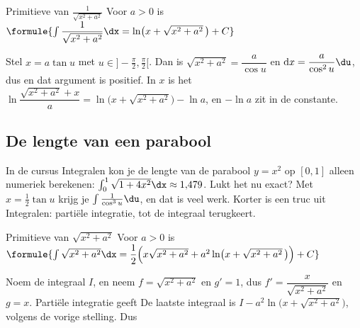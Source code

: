 \begin{theorie}
\begin{stelling}{Primitieve van $\frac{1}{\sqrt{x^2 + a^2}}$}
Voor $a > 0$ is \qquad $\formule{\int \dfrac{1}{\sqrt{x^2 + a^2}}\dx = \ln\bigl(x + \sqrt{x^2 + a^2}\,\bigr) + C}$
\end{stelling}

\begin{bewijs}
Stel $x = a\tan u$ met $u \in \bigl]-\tfrac{\pi}{2}, \tfrac{\pi}{2}\bigr[$. Dan is $\sqrt{x^2 + a^2} = \dfrac{a}{\cos u}$ en $\mathrm{d}x = \dfrac{a}{\cos^2 u}\du$, dus
en dat argument is positief. In $x$ is het $\ln\dfrac{\sqrt{x^2 + a^2} + x}{a} = \ln\bigl(x + \sqrt{x^2 + a^2}\bigr) - \ln a$, en $-\ln a$ zit in de constante.
\end{bewijs}
\end{theorie}

\subsection{De lengte van een parabool}

In de cursus Integralen kon je de lengte van de parabool $y = x^2$ op $[0, 1]$ alleen numeriek berekenen: $\int_0^1 \sqrt{1 + 4x^2}\dx \approx 1{,}479$. Lukt het nu exact? Met $x = \tfrac12\tan u$ krijg je $\int \tfrac{1}{\cos^3 u}\du$, en dat is veel werk. Korter is een truc uit Integralen: partiële integratie, tot de integraal terugkeert.

\begin{theorie}
\begin{stelling}{Primitieve van $\sqrt{x^2 + a^2}$}
Voor $a > 0$ is \qquad $\formule{\int \sqrt{x^2 + a^2}\dx = \dfrac12\Bigl(x\sqrt{x^2 + a^2} + a^2\ln\bigl(x + \sqrt{x^2 + a^2}\,\bigr)\Bigr) + C}$
\end{stelling}

\begin{bewijs}
Noem de integraal $I$, en neem $f = \sqrt{x^2 + a^2}$ en $g' = 1$, dus $f' = \dfrac{x}{\sqrt{x^2 + a^2}}$ en $g = x$. Partiële integratie geeft
De laatste integraal is $I - a^2\ln\bigl(x + \sqrt{x^2 + a^2}\bigr)$, volgens de vorige stelling. Dus
\end{bewijs}
\end{theorie}


